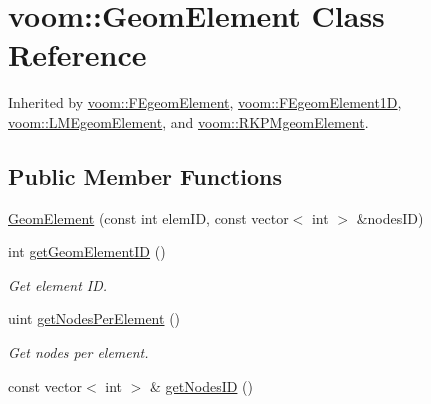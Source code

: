 \hypertarget{classvoom_1_1_geom_element}{
\section{voom::GeomElement Class Reference}
\label{classvoom_1_1_geom_element}
}


Inherited by \hyperlink{classvoom_1_1_f_egeom_element}{voom::FEgeomElement}, \hyperlink{classvoom_1_1_f_egeom_element1_d}{voom::FEgeomElement1D}, \hyperlink{classvoom_1_1_l_m_egeom_element}{voom::LMEgeomElement}, and \hyperlink{classvoom_1_1_r_k_p_mgeom_element}{voom::RKPMgeomElement}.\subsection*{Public Member Functions}
\begin{DoxyCompactItemize}
\item 
\hyperlink{classvoom_1_1_geom_element_a81373f05c7c57bf7f525766d6b6f679b}{GeomElement} (const int elemID, const vector$<$ int $>$ \&nodesID)
\item 
\hypertarget{classvoom_1_1_geom_element_a5de22b304150a751d2e9c8f66c891e50}{
int \hyperlink{classvoom_1_1_geom_element_a5de22b304150a751d2e9c8f66c891e50}{getGeomElementID} ()}
\label{classvoom_1_1_geom_element_a5de22b304150a751d2e9c8f66c891e50}

\begin{DoxyCompactList}\small\item\em Get element ID. \item\end{DoxyCompactList}\item 
\hypertarget{classvoom_1_1_geom_element_a0b4867d116a407e93ad1579d7444c565}{
uint \hyperlink{classvoom_1_1_geom_element_a0b4867d116a407e93ad1579d7444c565}{getNodesPerElement} ()}
\label{classvoom_1_1_geom_element_a0b4867d116a407e93ad1579d7444c565}

\begin{DoxyCompactList}\small\item\em Get nodes per element. \item\end{DoxyCompactList}\item 
\hypertarget{classvoom_1_1_geom_element_a9c4dd5d2410bb397a08561f952bd503f}{
const vector$<$ int $>$ \& \hyperlink{classvoom_1_1_geom_element_a9c4dd5d2410bb397a08561f952bd503f}{getNodesID} ()}
\label{classvoom_1_1_geom_element_a9c4dd5d2410bb397a08561f952bd503f}


\end{DoxyCompactItemize}

